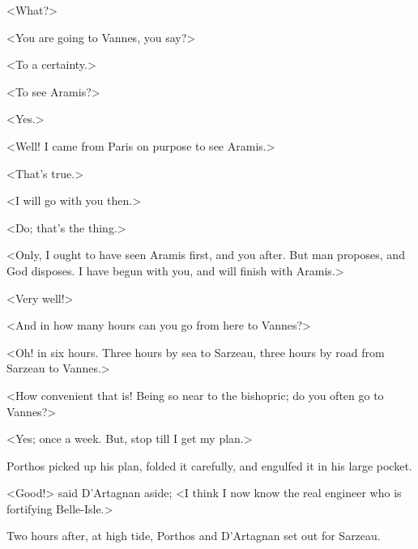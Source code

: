 <What?>

<You are going to Vannes, you say?>

<To a certainty.>

<To see Aramis?>

<Yes.>

<Well! I came from Paris on purpose to see Aramis.>

<That's true.>

<I will go with you then.>

<Do; that's the thing.>

<Only, I ought to have seen Aramis first, and you after. But man proposes, and God disposes. I have begun with you, and will finish with Aramis.>

<Very well!>

<And in how many hours can you go from here to Vannes?>

<Oh!  in six hours. Three hours by sea to Sarzeau, three hours by road from Sarzeau to Vannes.>

<How convenient that is! Being so near to the bishopric; do you often go to Vannes?>

<Yes; once a week. But, stop till I get my plan.>

Porthos picked up his plan, folded it carefully, and engulfed it in his large pocket.

<Good!> said D'Artagnan aside; <I think I now know the real engineer who is fortifying Belle-Isle.>

Two hours after, at high tide, Porthos and D'Artagnan set out for Sarzeau. 